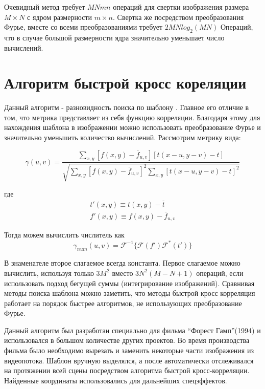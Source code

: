 \documentclass[oneside,final,14pt]{extreport}
\begin{document}
Очевидный метод требует $MNmn$ операций для свертки изображения размера $M\times N$ с ядром размерности $m\times n$. Свертка же посредством преобразования Фурье, вместе со всеми преобразованиями требует $2MNlog_2(MN)$ Операций, что в случае большой размерности ядра значительно уменьшает число вычислений. 

\section{Алгоритм быстрой  кросс кореляции}
Данный алгоритм  - разновидность поиска по шаблону \cite{Cross-Correlation}. Главное его отличие в том, что метрика представляет из себя функцию корреляции. Благодаря этому для нахождения шаблона в изображении можно использовать преобразование Фурье и значительно уменьшить количество вычислений. 
Рассмотрим метрику вида:

\begin{equation}
\gamma(u,v)
=
\frac{
\sum_{x,y}
[f(x,y) - \overline{f}_{u,v}]
[t(x-u,y-v)-t]
}
{
\sqrt{
\sum_{x,y}
[f(x,y) - \overline{f}_{u,v}]^2
\sum_{x,y}
[t(x-u,y-v)-t]^2
}
} 
\end{equation}

где
\begin{gather*}
t'(x,y)
\equiv
t(x,y) - \overline{t}
\\
f'(x,y)
\equiv
f(x,y) - \overline{f}_{u,v}
\end{gather*}

Тогда можем вычислить числитель как
\begin{equation}
\gamma_{num}(u,v)
=
\mathcal{F}^{-1}
\{
\mathcal{F}(f')
\mathcal{F}^*(t')
\}
\end{equation}

В знаменателе второе слагаемое всегда константа. Первое слагаемое можно вычислить, используя только $3M^2$   вместо $3N^2(M-N+1)$ операций, если использовать подход бегущей суммы (интегрирование изображений). 
Сравнивая методы поиска шаблона можно заметить, что методы быстрой кросс корреляция работает на порядок быстрее алгоритмов, не использующих преобразование Фурье. 

Данный алгоритм был разработан специально для фильма “Форест Гамп”(1994) и использовался в большом количестве других проектов. Во время производства фильма было необходимо вырезать и заменить некоторые части изображения из видеопотока. Шаблон вручную выделялся, а после автоматически отслеживался на протяжении всей сцены посредством алгоритма быстрой кросс-корреляции. Найденные координаты использовались для дальнейших спецэффектов.
\end{document}
